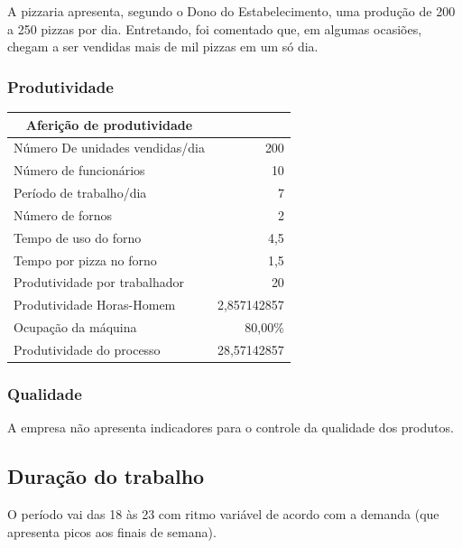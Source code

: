 \documentclass[11pt]{article}
\begin{document}
A pizzaria apresenta, segundo o Dono do Estabelecimento, uma produção de 200 a 250 pizzas por dia. Entretando, foi comentado que, em algumas ocasiões, chegam a ser vendidas mais de mil pizzas em um só dia.

\subsubsection{Produtividade}

\begin{table}[htbp]


    \begin{tabular}{|l|r|}
    \hline
    \multicolumn{1}{|c|}{Aferição de produtividade} & \multicolumn{1}{l|}{} \\ \hline
    Número De unidades vendidas/dia & 200 \\ \hline
    Número de funcionários & 10 \\ \hline
    Período de trabalho/dia & 7 \\ \hline
    Número de fornos & 2 \\ \hline
    Tempo de uso do forno & 4,5 \\ \hline
    Tempo por pizza no forno & 1,5 \\ \hline
    Produtividade por trabalhador & 20 \\ \hline
    Produtividade Horas-Homem & 2,857142857 \\ \hline
    Ocupação da máquina & 80,00\% \\ \hline
    Produtividade do processo & 28,57142857 \\ \hline
    \end{tabular}
    \label{}
    \end{table}


\newpage{}

\subsubsection{Qualidade}

A empresa não apresenta indicadores para o controle da qualidade dos produtos. 

\subsection{Duração do trabalho}

O período vai das 18 às 23 com ritmo variável de acordo com a demanda (que apresenta picos aos finais de semana).
\end{document}
